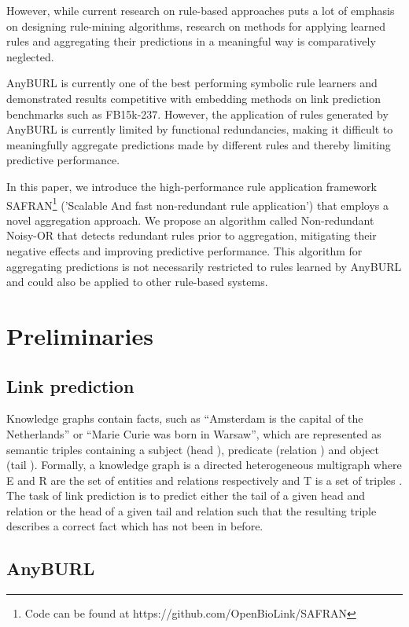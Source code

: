 \documentclass[akbc,twoside,11pt,lettersize]{article}
\begin{document}
However, while current research on rule-based approaches puts a lot of emphasis on designing rule-mining algorithms, research on methods for applying learned rules and aggregating their predictions in a meaningful way is comparatively neglected.

AnyBURL \cite{meilicke_2019,meilicke_2020} is currently one of the best performing symbolic rule learners and demonstrated results competitive with embedding methods on link prediction benchmarks such as FB15k-237. However, the application of rules generated by AnyBURL is currently limited by functional redundancies, making it difficult to meaningfully aggregate predictions made by different rules and thereby limiting predictive performance.

In this paper, we introduce the high-performance rule application framework SAFRAN\footnote{Code can be found at https://github.com/OpenBioLink/SAFRAN} ('Scalable And fast non-redundant rule application') that employs a novel aggregation approach. We propose an algorithm called Non-redundant Noisy-OR that detects redundant rules prior to aggregation, mitigating their negative effects and improving predictive performance. This algorithm for aggregating predictions is not necessarily restricted to rules learned by AnyBURL and could also be applied to other rule-based systems.

\section{Preliminaries}

\subsection{Link prediction}

Knowledge graphs contain facts, such as “Amsterdam is the capital of the Netherlands” or “Marie Curie was born in Warsaw”, which are represented as semantic triples containing a subject (head ), predicate (relation ) and object (tail ). Formally, a knowledge graph is a directed heterogeneous multigraph  where E and R are the set of entities and relations respectively and T is a set of triples . The task of link prediction is to predict either the tail of a given head and relation  or the head of a given tail and relation  such that the resulting triple describes a correct fact which has not been in  before.

\subsection{AnyBURL}
\end{document}
